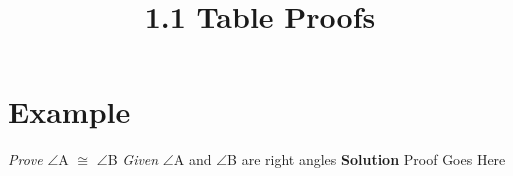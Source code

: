 \documentclass{article}
\begin{document}
\setlength{\droptitle}{-5em}
\title{1.1 Table Proofs}
\date{}
\author{}
\maketitle

\section{Example}
\textit{Prove} $\angle$A $\cong$ $\angle$B \newline \newline
\textit{Given} $\angle$A and $\angle$B are right angles\newline \newline
\textbf{Solution} \newline
Proof Goes Here

\end{document}
